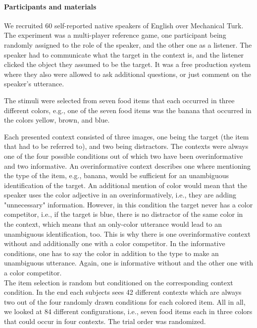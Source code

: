 \documentclass[10pt,letterpaper]{article}
\begin{document}
\paragraph{Participants and materials}
We recruited 60 self-reported native speakers of English over Mechanical Turk. The experiment was a multi-player reference game, one participant being randomly assigned to the role of the speaker, and the other one as a listener. The speaker had to communicate what the target in the context is, and the listener clicked the object they assumed to be the target. It was a free production system where they also were allowed to ask additional questions, or just comment on the speaker's utterance. 

The stimuli were selected from seven food items that each occurred in three different colors, e.g., one of the seven food items was the banana that occurred in the colors yellow, brown, and blue.

Each presented context consisted of three images, one being the target (the item that had to be referred to), and two being distractors. The contexts were always one of the four possible conditions out of which two have been overinformative and two informative. An overinformative context describes one where mentioning the type of the item, e.g., banana, would be sufficient for an unambiguous identification of the target. An additional mention of color would mean that the speaker uses the color adjective in an overinformatively, i.e., they are adding "unnecessary" information. However, in this condition the target never has a color competitor, i.e., if the target is blue, there is no distractor of the same color in the context, which means that an only-color utterance would lead to an unambiguous identification, too. This is why there is one overinformative context without and additionally one with a color competitor. In the informative conditions, one has to say the color in addition to the type to make an unambiguous utterance. Again, one is informative without and the other one with a color competitor.
\\The item selection is random but conditioned on the corresponding context condition. In the end each subjects sees 42 different contexts which are always two out of the four randomly drawn conditions for each colored item. All in all, we looked at 84 different configurations, i.e., seven food items each in three colors that could occur in four contexts. The trial order was randomized.
\end{document}
